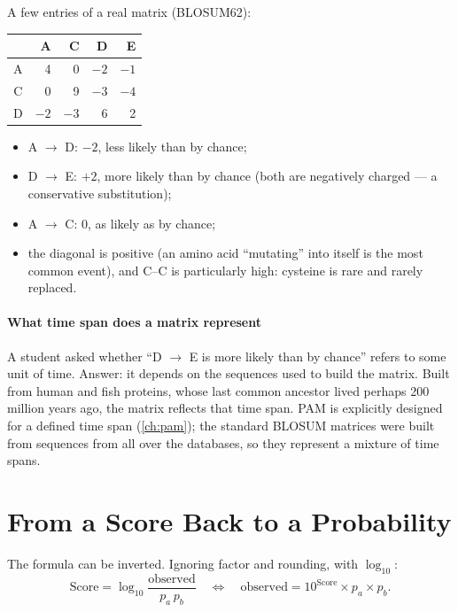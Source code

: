 \documentclass[11pt, oneside]{book}
\newcommand{\obs}{\mathrm{observed}}
\let\originalsection\section
\renewcommand{\section}{\Needspace{7\baselineskip}\originalsection}
\begin{document}
\begin{exbox}[title={Reading real scores}]
A few entries of a real matrix (BLOSUM62):

\begin{center}
\small
\begin{tabular}{@{}c|rrrr@{}}
 & A & C & D & E \\
\midrule
A & 4 & 0 & $-2$ & $-1$ \\
C & 0 & 9 & $-3$ & $-4$ \\
D & $-2$ & $-3$ & 6 & 2 \\
\end{tabular}
\end{center}

\begin{itemize}
  \item A $\to$ D: $-2$, less likely than by chance;
  \item D $\to$ E: $+2$, more likely than by chance (both are negatively
    charged --- a conservative substitution);
  \item A $\to$ C: 0, as likely as by chance;
  \item the diagonal is positive (an amino acid ``mutating'' into itself is
    the most common event), and C--C is particularly high: cysteine is rare
    and rarely replaced.
\end{itemize}
\end{exbox}

\paragraph{What time span does a matrix represent}
A student asked whether ``D $\to$ E is more likely than by chance'' refers to
some unit of time. Answer: it depends on the sequences used to build the
matrix. Built from human and fish proteins, whose last common ancestor lived
perhaps 200 million years ago, the matrix reflects that time span. PAM is
explicitly designed for a defined time span (\cref{ch:pam}); the standard
BLOSUM matrices were built from sequences from all over the databases, so they
represent a mixture of time spans.

\section{From a Score Back to a Probability}

The formula can be inverted. Ignoring factor and rounding, with
$\log_{10}$:
\[
  \mathrm{Score} = \log_{10}\frac{\obs}{p_a\, p_b}
  \quad\Longleftrightarrow\quad
  \obs = 10^{\mathrm{Score}} \times p_a \times p_b .
\]
\end{document}
